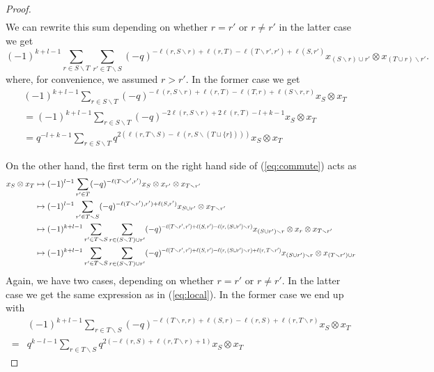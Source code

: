\documentclass[11pt]{amsart}
\begin{document}
\begin{proof}
\begin{align*}
\end{align*}
We can rewrite this sum depending on whether $r=r'$ or $r \ne r'$ in the latter case we get
\begin{equation}\label{eq:local}
(-1)^{k+l-1} \sum_{r \in S \smallsetminus T} \sum_{r' \in T \smallsetminus S} (-q)^{-\ell(r,S \smallsetminus r) + \ell(r,T) - \ell(T \smallsetminus r', r') + \ell(S,r')} x_{(S \smallsetminus r) \cup r'} \otimes x_{(T \cup r) \smallsetminus r'}.
\end{equation}
where, for convenience, we assumed $r > r'$. In the former case we get
\begin{align*}
& (-1)^{k+l-1} \sum_{r \in S \smallsetminus T} (-q)^{-\ell(r,S \smallsetminus r) + \ell(r,T) - \ell(T,r) + \ell(S \smallsetminus r,r)} x_S \otimes x_T \\
&= (-1)^{k+l-1} \sum_{r \in S \smallsetminus T} (-q)^{-2\ell(r,S \smallsetminus r) + 2\ell(r,T) - l + k - 1} x_S \otimes x_T \\
& = q^{-l+k-1} \sum_{r \in S \smallsetminus T} q^{2 (\ell(r,T \smallsetminus S) -  \ell(r, S \smallsetminus (T \sqcup \{r\}))) } x_S \otimes x_T
\end{align*}

On the other hand, the first term on the right hand side of (\ref{eq:commute}) acts as
\begin{align*}
x_S \otimes x_T
&\mapsto (-1)^{l-1} \sum_{r' \in T} (-q)^{-\ell(T \smallsetminus r', r')} x_S \otimes x_{r'} \otimes x_{T \smallsetminus r'} \\
&\mapsto (-1)^{l-1} \sum_{r' \in T \smallsetminus S} (-q)^{-\ell(T \smallsetminus r'), r') + \ell(S,r')} x_{S \cup r'} \otimes x_{T \smallsetminus r'} \\
&\mapsto (-1)^{k+l-1} \sum_{r' \in T \smallsetminus S} \sum_{r \in (S \smallsetminus T) \cup r'} (-q)^{\scalebox{0.7}{$-\ell(T {\smallsetminus} r', r') {+} \ell(S,r') {-} \ell(r, (S {\cup} r') {\smallsetminus} r)$}} x_{(S \cup r') \smallsetminus r} \otimes x_r \otimes x_{T \smallsetminus r'} \\
&\mapsto (-1)^{k+l-1} \sum_{r' \in T \smallsetminus S} \sum_{r \in (S \smallsetminus T) \cup r'} (-q)^{\scalebox{0.7}{$-\ell(T {\smallsetminus} r', r') {+} \ell(S,r') {-} \ell(r, (S {\cup} r') {\smallsetminus} r) {+} \ell(r, T {\smallsetminus} r')$}} x_{(S \cup r') \smallsetminus r} \otimes x_{(T \smallsetminus r') \cup r}
\end{align*}
Again, we have two cases, depending on whether $r = r'$ or $r \ne r'$. In the latter case we get the same expression as in (\ref{eq:local}). In the former case we end up with
\begin{align*}
& (-1)^{k+l-1} \sum_{r \in T \smallsetminus S} (-q)^{-\ell(T \smallsetminus r,r) + \ell(S,r) - \ell(r,S) + \ell(r,T \smallsetminus r)} x_S \otimes x_T \\
= & q^{k-l-1} \sum_{r \in T \smallsetminus S} q^{2( - \ell(r,S) + \ell(r, T \smallsetminus r) +1) } x_S \otimes x_T
\end{align*}


\end{proof}
\end{document}
